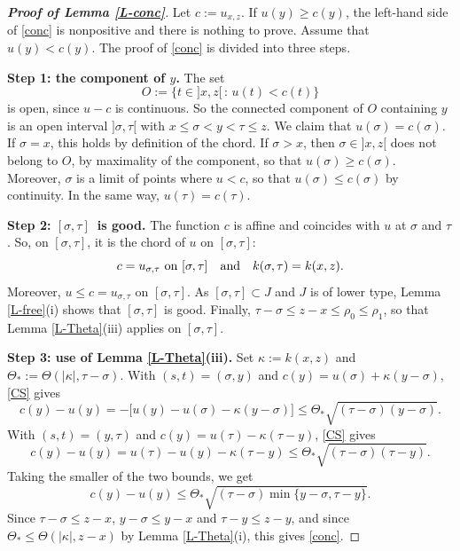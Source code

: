 \documentclass[reqno,12pt]{amsart}
\numberwithin{equation}{section}
\theoremstyle{remark}
\begin{document}
\begin{proof}[\bf Proof of Lemma \ref{L-conc}]
Let $c:=u_{x,z}$. If $u(y)\geq c(y)$, the left-hand side of \eqref{conc} is nonpositive and there is nothing to prove. Assume that $u(y)<c(y)$. The proof of \eqref{conc} is divided into three steps.

\medskip

{\bf Step 1: the component of \boldmath$y$\unboldmath.} The set
\begin{equation*}
O:=\big\{t\in]x,z[\,:\,u(t)<c(t)\big\}
\end{equation*}
is open, since $u-c$ is continuous. So the connected component of $O$ containing $y$ is an open interval $]\sigma,\tau[$ with $x\leq\sigma<y<\tau\leq z$. We claim that $u(\sigma)=c(\sigma)$. If $\sigma=x$, this holds by definition of the chord. If $\sigma>x$, then $\sigma\in]x,z[$ does not belong to $O$, by maximality of the component, so that $u(\sigma)\geq c(\sigma)$. Moreover, $\sigma$ is a limit of points where $u<c$, so that $u(\sigma)\leq c(\sigma)$ by continuity. In the same way, $u(\tau)=c(\tau)$.

\medskip

{\bf Step 2: \boldmath$[\sigma,\tau]$\unboldmath\ is good.} The function $c$ is affine and coincides with $u$ at $\sigma$ and $\tau$. So, on $[\sigma,\tau]$, it is the chord of $u$ on $[\sigma,\tau]$:
\begin{equation*}
c=u_{\sigma,\tau}\hbox{ on }[\sigma,\tau]\quad\hbox{and}\quad k(\sigma,\tau)=k(x,z).
\end{equation*}
Moreover, $u\leq c=u_{\sigma,\tau}$ on $[\sigma,\tau]$. As $[\sigma,\tau]\subset J$ and $J$ is of lower type, Lemma \ref{L-free}(i) shows that $[\sigma,\tau]$ is good. Finally, $\tau-\sigma\leq z-x\leq\rho_0\leq\rho_1$, so that Lemma \ref{L-Theta}(iii) applies on $[\sigma,\tau]$.

\medskip

{\bf Step 3: use of Lemma \ref{L-Theta}(iii).} Set $\kappa:=k(x,z)$ and $\Theta_*:=\Theta(|\kappa|,\tau-\sigma)$. With $(s,t)=(\sigma,y)$ and $c(y)=u(\sigma)+\kappa(y-\sigma)$, \eqref{CS} gives
\begin{equation*}
c(y)-u(y)=-\big[u(y)-u(\sigma)-\kappa(y-\sigma)\big]\leq\Theta_*\sqrt{(\tau-\sigma)(y-\sigma)}.
\end{equation*}
With $(s,t)=(y,\tau)$ and $c(y)=u(\tau)-\kappa(\tau-y)$, \eqref{CS} gives
\begin{equation*}
c(y)-u(y)=u(\tau)-u(y)-\kappa(\tau-y)\leq\Theta_*\sqrt{(\tau-\sigma)(\tau-y)}.
\end{equation*}
Taking the smaller of the two bounds, we get
\begin{equation*}
c(y)-u(y)\leq\Theta_*\sqrt{(\tau-\sigma)\min\{y-\sigma,\tau-y\}}.
\end{equation*}
Since $\tau-\sigma\leq z-x$, $y-\sigma\leq y-x$ and $\tau-y\leq z-y$, and since $\Theta_*\leq\Theta(|\kappa|,z-x)$ by Lemma \ref{L-Theta}(i), this gives \eqref{conc}.


\end{proof}
\end{document}
